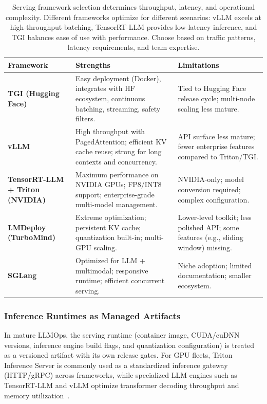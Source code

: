 \begin{table}[t]
\centering
\small
\caption{Serving framework selection determines throughput, latency, and operational complexity. Different frameworks optimize for different scenarios: vLLM excels at high-throughput batching, TensorRT-LLM provides low-latency inference, and TGI balances ease of use with performance. Choose based on traffic patterns, latency requirements, and team expertise.}
\label{tab:ch03_servingcompare}
\setlength{\tabcolsep}{6pt}
\renewcommand{\arraystretch}{1.3}
\begin{tabularx}{\linewidth}{@{}l>{\raggedright\arraybackslash}X>{\raggedright\arraybackslash}X@{}}
\toprule
\rowcolor{gray!15}
\textbf{Framework} & \textbf{Strengths} & \textbf{Limitations} \\
\midrule
\textbf{TGI (Hugging Face)} &
Easy deployment (Docker), integrates with HF ecosystem, continuous batching, streaming, safety filters. &
Tied to Hugging Face release cycle; multi-node scaling less mature. \\
\addlinespace[2pt]
\textbf{vLLM} &
High throughput with PagedAttention; efficient KV cache reuse; strong for long contexts and concurrency. &
API surface less mature; fewer enterprise features compared to Triton/TGI. \\
\addlinespace[2pt]
\textbf{TensorRT-LLM + Triton (NVIDIA)} &
Maximum performance on NVIDIA GPUs; FP8/INT8 support; enterprise-grade multi-model management. &
NVIDIA-only; model conversion required; complex configuration. \\
\addlinespace[2pt]
\textbf{LMDeploy (TurboMind)} &
Extreme optimization; persistent KV cache; quantization built-in; multi-GPU scaling. &
Lower-level toolkit; less polished API; some features (e.g., sliding window) missing. \\
\addlinespace[2pt]
\textbf{SGLang} &
Optimized for LLM + multimodal; responsive runtime; efficient concurrent serving. &
Niche adoption; limited documentation; smaller ecosystem. \\
\bottomrule
\end{tabularx}
\end{table}


\subsubsection{Inference Runtimes as Managed Artifacts}\label{sec:serving-runtimes}
In mature LLMOps, the serving runtime (container image, CUDA/cuDNN versions, inference engine build flags, and quantization configuration) is treated as a versioned artifact with its own release gates.
For GPU fleets, Triton Inference Server is commonly used as a standardized inference gateway (HTTP/gRPC) across frameworks, while specialized LLM engines such as TensorRT-LLM and vLLM optimize transformer decoding throughput and memory utilization~\cite{triton_docs,tensorrt_llm_docs,tgi_docs,pagedattention_paper}.



